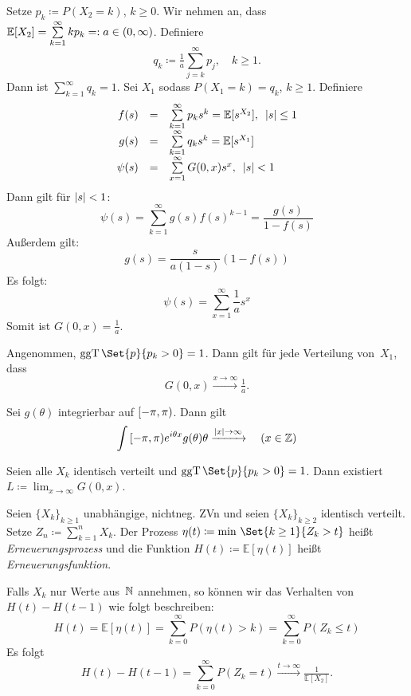 \documentclass{cheat-sheet}
\newcommand{\E}{\mathbb{E}} %
\DeclareMathOperator{\ggT}{ggT} %
\begin{document}
\begin{bsp}
  Setze $p_k \coloneqq P(X_2 = k)$, $k \geq 0$.
  Wir nehmen an, dass $\E[X_2] = \sum_{k=1}^\infty k p_k =: a \in \ointerval{0}{\infty}$.
  Definiere
  \[ q_k \coloneqq \tfrac{1}{a} \sum_{j=k}^\infty p_j, \quad k \geq 1. \]
  Dann ist $\sum_{k=1}^\infty q_k = 1$.
  Sei $X_1$ sodass $P(X_1=k) = q_k$, $k \geq 1$.
  Definiere
  \[
    \begin{array}{r c l}
      f(s) &=& \sum_{k=1}^\infty p_k s^k = \E[s^{X_2}], \enspace \abs{s} \leq 1 \\
      g(s) &=& \sum_{k=1}^\infty q_k s^k = \E[s^{X_1}] \\
      \psi(s) &=& \sum_{x=1}^\infty G(0, x) s^x, \enspace \abs{s} < 1
    \end{array}
  \]
  Dann gilt für $\lvert s\rvert < 1$:
  \[ \psi(s) = \sum_{k=1}^\infty g(s) f(s)^{k-1} = \frac{g(s)}{1 - f(s)} \]
  Außerdem gilt:
  \[ g(s) = \frac{s}{a (1-s)} (1 - f(s)) \]
  Es folgt:
  \[ \psi(s) = \sum_{x=1}^\infty \frac{1}{a} s^x \]
  Somit ist $G(0, x) = \tfrac{1}{a}$.
\end{bsp}

\begin{satz}
  Angenommen, $\ggT \Set{p}{p_k > 0} = 1$.
  Dann gilt für jede Verteilung von~$X_1$, dass
  \[ G(0, x) \xrightarrow{x \to \infty} \tfrac{1}{a}. \]
\end{satz}

\begin{lem}
  Sei $g(\theta)$ integrierbar auf $\left[ -\pi, \pi \right)$.
  Dann gilt
  \[
    \int{\left[ -\pi, \pi \right)}{}{e^{i \theta x} g(\theta)}{\theta} \xrightarrow{\lvert x\rvert \to \infty}
    \quad (x \in \mathbb{Z})
  \]
\end{lem}

\begin{lem}
  Seien alle $X_k$ identisch verteilt und $\ggT \Set{p}{p_k > 0} = 1$.
  Dann existiert $L \coloneqq \lim_{x \to \infty} G(0, x)$.
\end{lem}

\begin{defn}
  Seien $\{ X_k \}_{k \geq 1}$ unabhängige, nichtneg. ZVn und seien $\{ X_k \}_{k \geq 2}$ identisch verteilt.
  Setze $Z_n \coloneqq \sum_{k=1}^n X_k$.
  Der Prozess $\eta(t) \coloneqq \min\,\Set{k \geq 1}{Z_k > t}$ heißt \emph{Erneuerungsprozess} und die Funktion $H(t) \coloneqq \E[\eta(t)]$ heißt \emph{Erneuerungsfunktion}.
\end{defn}

Falls $X_k$ nur Werte aus~$\mathbb{N}$ annehmen, so können wir das Verhalten von $H(t) - H(t-1)$ wie folgt beschreiben:
\[ H(t) = \E[\eta(t)] = \sum_{k=0}^\infty P(\eta(t) > k) = \sum_{k=0}^\infty P(Z_k \leq t) \]
Es folgt
\[
  H(t) - H(t-1) = \sum_{k=0}^\infty P(Z_k = t) \xrightarrow{t \to \infty} \tfrac{1}{\E[X_2]}.
\]
\end{document}
